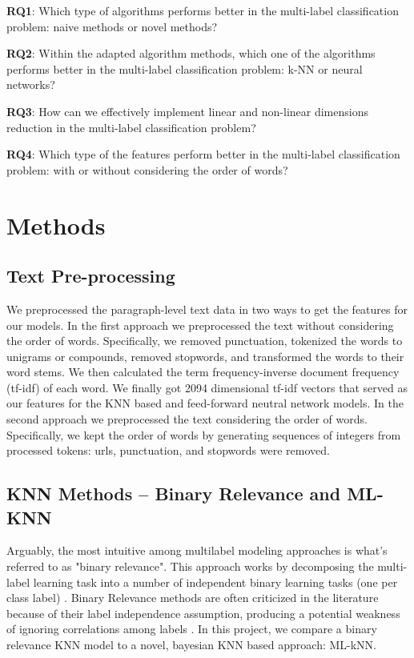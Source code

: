 \documentclass[11pt]{article}
\begin{document}
\textbf{RQ1}: Which type of algorithms performs better in the multi-label classification problem: naive methods or novel methods? 

\textbf{RQ2}: Within the adapted algorithm methods, which one of the algorithms performs better in the multi-label classification problem: k-NN or neural networks?

\textbf{RQ3}: How can we effectively implement linear and non-linear dimensions reduction in the multi-label classification problem?

\textbf{RQ4}: Which type of the features perform better in the multi-label classification problem: with or without considering the order of words? 

\section{Methods}

\subsection{Text Pre-processing}
We preprocessed the paragraph-level text data in two ways to get the features for our models. In the first approach we preprocessed the text without considering the order of words. Specifically, we removed punctuation, tokenized the words to unigrams or compounds, removed stopwords, and transformed the words to their word stems. We then calculated the term frequency-inverse document frequency (tf-idf) of each word. We finally got 2094 dimensional tf-idf vectors that served as our features for the KNN based and feed-forward neutral network models. In the second approach we preprocessed the text considering the order of words. Specifically, we kept the order of words by generating sequences of integers from processed tokens: urls, punctuation, and stopwords were removed. 

\subsection{KNN Methods -- Binary Relevance and ML-KNN}

Arguably, the most intuitive among multilabel modeling approaches is what's referred to as "binary relevance". This approach works by decomposing the multi-label learning task into a number of independent binary learning tasks (one per class label) \autocite{brOverview}. Binary Relevance methods are often criticized in the literature because of their label independence assumption, producing a potential weakness of ignoring correlations among labels \autocite{brEfficacy}. In this project, we compare a binary relevance KNN model to a novel, bayesian KNN based approach: ML-kNN.
\end{document}
